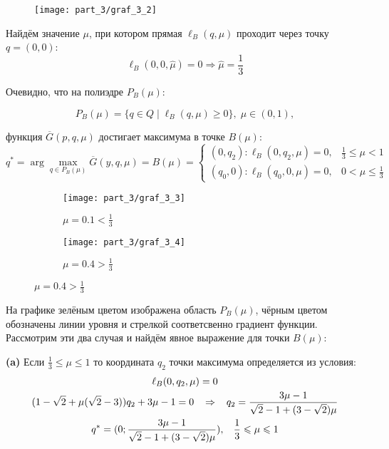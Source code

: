\begin{figure}[H]
	\centering
  	\texttt{[image: part\_3/graf\_3\_2]}
  	\caption{}
  	\label{fig:l_B_limits}
\end{figure}
Найдём значение $\mu$, при котором прямая $\ell_B(q, \mu)$ проходит через точку
$q=(0,0)$:
$$
	\ell_B(0,0,\hat \mu) = 0
	\Rightarrow \hat \mu = \frac{1}{3}
$$	
	
Очевидно, что на полиэдре $P_B(\mu):$
		
$$
	P_B(\mu)=\{q \in Q \; | 
	\;  \ell_B(q, \mu) \geqslant 0 \}, \; \mu \in (0,1),
$$
	
функция $\overline{G}(p,q,\mu)$ достигает максимума в точке $B(\mu):$
$$
	q^* = \arg \max \limits_{q\in P_B(\mu)} \overline G(y,q,\mu) = B(\mu)=
	\begin{cases}
		(0, q_2) : \ell_B(0,q_2,\mu)=0, & \frac{1}{3} \leqslant \mu < 1 \\
		(q_0, 0) : \ell_B(q_0,0,\mu)=0, & 0 < \mu \leqslant \frac{1}{3}
	\end{cases}	
$$

\begin{figure}[H]
   	\centering
	\begin{subfigure}[b]{0.4 \textwidth}
        \centering
        \texttt{[image: part\_3/graf\_3\_3]}
        \caption{$\mu=0.1 < \frac{1}{3}$}
         \label{fig:y equals x}
     \end{subfigure}
     \hspace{10mm}
     \begin{subfigure}[b]{0.4 \textwidth}
       	\centering
       	\texttt{[image: part\_3/graf\_3\_4]}
       	\caption{$\mu=0.4 > \frac{1}{3}$}
       	\label{fig:three sin x}
     \end{subfigure}
\end{figure}	

На графике зелёным цветом изображена область $P_B(\mu)$, чёрным цветом
обозначены линии уровня и стрелкой соответсвенно градиент функции.
Рассмотрим эти два случая и найдём явное выражение для точки $B(\mu)$:
	
\textbf{(a)}
Если $\frac{1}{3} \leqslant \mu \leqslant 1$ то координата $q_2$ 
точки максимума определяется из условия: 	
\begin{gather*}
	\ell_B(0,q_2,\mu)=0
	\\
	(1-\sqrt{2}+\mu(\sqrt{2}-3))q_2+3\mu-1=0
	\hspace{3mm} \Rightarrow \hspace{3mm}
	q_2=\frac{3\mu-1}{\sqrt{2}-1+(3-\sqrt{2})\mu}	
	\\
	q^*=(0;\dfrac{3\mu-1}{\sqrt{2}-1+(3-\sqrt{2})\mu}), \hspace{3mm}
	\frac{1}{3} \leqslant \mu \leqslant 1
\end{gather*}


